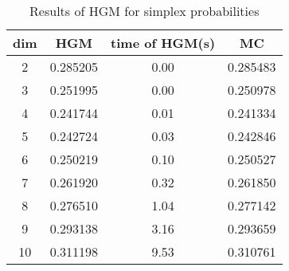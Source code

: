 \begin{table}[htbp]
\begin{center}
\begin{tabular}{cccc}
dim& HGM & time of HGM(s) & MC\\
\hline
2 & 0.285205 & 0.00 & 0.285483\\
3 & 0.251995 & 0.00 & 0.250978\\
4 & 0.241744 & 0.01 & 0.241334\\
5 & 0.242724 & 0.03 & 0.242846\\
6 & 0.250219 & 0.10 & 0.250527\\
7 & 0.261920 & 0.32 & 0.261850\\
8 & 0.276510 & 1.04 & 0.277142\\
9 & 0.293138 & 3.16 & 0.293659\\
10 & 0.311198 & 9.53 & 0.310761\\
\hline
\end{tabular}
\end{center}
\caption{Results of HGM for simplex probabilities}
\label{tab1}
\end{table}
